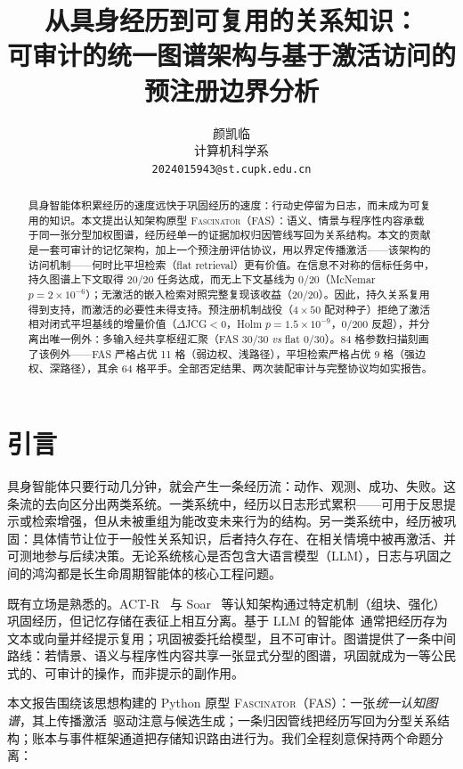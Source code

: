 \documentclass[10pt,a4paper]{ctexart}
\title{\bfseries 从具身经历到可复用的关系知识：\\
可审计的统一图谱架构与基于激活访问的\\
预注册边界分析}
\author{颜凯临\\ \small 计算机科学系\\ \small \texttt{2024015943@st.cupk.edu.cn}}
\date{}
\begin{document}
\maketitle

\begin{abstract}
具身智能体积累经历的速度远快于巩固经历的速度：行动史停留为日志，而未成为可复用的知识。本文提出认知架构原型 \textsc{Fascinator}（FAS）：语义、情景与程序性内容承载于同一张分型加权图谱，经历经单一的证据加权归因管线写回为关系结构。本文的贡献是一套可审计的记忆架构，加上一个预注册评估协议，用以界定传播激活——该架构的访问机制——何时比平坦检索（flat retrieval）更有价值。在信息不对称的信标任务中，持久图谱上下文取得 20/20 任务达成，而无上下文基线为 0/20（McNemar $p{=}2\times10^{-6}$）；无激活的嵌入检索对照完整复现该收益（20/20）。因此，持久关系复用得到支持，而激活的必要性未得支持。预注册机制战役（$4\times50$ 配对种子）拒绝了激活相对闭式平坦基线的增量价值（$\Delta$JCG${<}0$，Holm $p{=}1.5\times10^{-9}$，0/200 反超），并分离出唯一例外：多输入经共享枢纽汇聚（FAS 30/30 \emph{vs} flat 0/30）。84 格参数扫描刻画了该例外——FAS 严格占优 11 格（弱边权、浅路径），平坦检索严格占优 9 格（强边权、深路径），其余 64 格平手。全部否定结果、两次装配审计与完整协议均如实报告。
\end{abstract}

\section{引言}
\label{sec:intro}

具身智能体只要行动几分钟，就会产生一条经历流：动作、观测、成功、失败。这条流的去向区分出两类系统。一类系统中，经历以日志形式累积——可用于反思提示或检索增强，但从未被重组为能改变未来行为的结构。另一类系统中，经历被巩固：具体情节让位于一般性关系知识，后者持久存在、在相关情境中被再激活、并可测地参与后续决策。无论系统核心是否包含大语言模型（LLM），日志与巩固之间的鸿沟都是长生命周期智能体的核心工程问题。

既有立场是熟悉的。ACT-R~\citep{anderson2004integrated} 与 Soar~\citep{laird2012soar} 等认知架构通过特定机制（组块、强化）巩固经历，但记忆存储在表征上相互分离。基于 LLM 的智能体~\citep{yao2023react,park2023generative,shinn2023reflexion}通常把经历存为文本或向量并经提示复用；巩固被委托给模型，且不可审计。图谱提供了一条中间路线：若情景、语义与程序性内容共享一张显式分型的图谱，巩固就成为一等公民式的、可审计的操作，而非提示的副作用。

本文报告围绕该思想构建的 Python 原型 \textsc{Fascinator}（FAS）：一张\emph{统一认知图谱}，其上传播激活~\citep{collins1975spreading}驱动注意与候选生成；一条归因管线把经历写回为分型关系结构；账本与事件框架通道把存储知识路由进行为。我们全程刻意保持两个命题分离：
\end{document}
